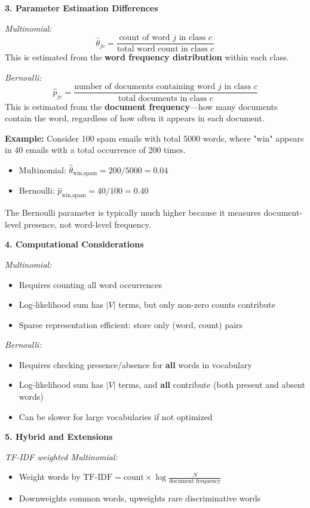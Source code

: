 \documentclass[12pt]{article}
\begin{document}
\begin{explanation}
\textbf{3. Parameter Estimation Differences}

\textit{Multinomial:}
\[
\hat{\theta}_{jc} = \frac{\text{count of word } j \text{ in class } c}{\text{total word count in class } c}
\]
This is estimated from the \textbf{word frequency distribution} within each class.

\textit{Bernoulli:}
\[
\hat{p}_{jc} = \frac{\text{number of documents containing word } j \text{ in class } c}{\text{total documents in class } c}
\]
This is estimated from the \textbf{document frequency}—how many documents contain the word, regardless of how often it appears in each document.

\textbf{Example:} Consider 100 spam emails with total 5000 words, where "win" appears in 40 emails with a total occurrence of 200 times.
\begin{itemize}
    \item Multinomial: $\hat{\theta}_{\text{win},\text{spam}} = 200/5000 = 0.04$
    \item Bernoulli: $\hat{p}_{\text{win},\text{spam}} = 40/100 = 0.40$
\end{itemize}

The Bernoulli parameter is typically much higher because it measures document-level presence, not word-level frequency.

\textbf{4. Computational Considerations}

\textit{Multinomial:}
\begin{itemize}
    \item Requires counting all word occurrences
    \item Log-likelihood sum has $|V|$ terms, but only non-zero counts contribute
    \item Sparse representation efficient: store only (word, count) pairs
\end{itemize}

\textit{Bernoulli:}
\begin{itemize}
    \item Requires checking presence/absence for \textbf{all} words in vocabulary
    \item Log-likelihood sum has $|V|$ terms, and \textbf{all} contribute (both present and absent words)
    \item Can be slower for large vocabularies if not optimized
\end{itemize}

\textbf{5. Hybrid and Extensions}

\textit{TF-IDF weighted Multinomial:}
\begin{itemize}
    \item Weight words by $\text{TF-IDF} = \text{count} \times \log \frac{N}{\text{document frequency}}$
    \item Downweights common words, upweights rare discriminative words
\end{itemize}


\end{explanation}
\end{document}
